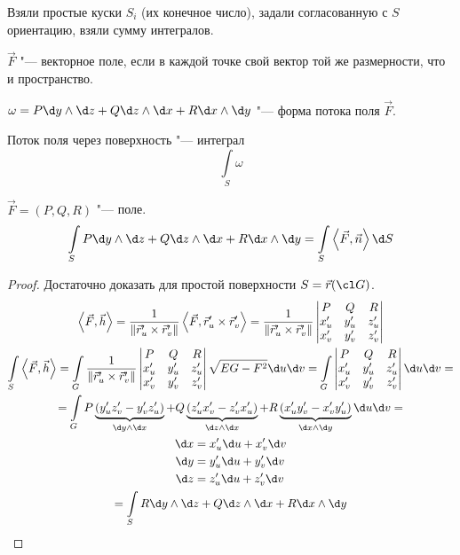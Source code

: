 \begin{Def}
	Взяли простые куски $S_i$ (их конечное число), задали согласованную с $S$ ориентацию, взяли сумму интегралов.
\end{Def}

\begin{Def}
	$\vec F$ "--- векторное поле, если в каждой точке свой вектор той же размерности, что и пространство.
\end{Def}

\begin{Def}
	$\omega = P \d y \wedge \d z + Q \d z \wedge \d x + R \d x \wedge \d y$ "--- форма потока поля $\vec F$.
\end{Def}

\begin{Def}
	Поток поля через поверхность "--- интеграл
	\[ \int\limits_S \omega \]
\end{Def}

\begin{theorem}
	$\vec F = (P, Q, R)$ "--- поле.
	\[ \int\limits_S P \d y \wedge \d z + Q \d z \wedge \d x + R \d x \wedge \d y = \int\limits_S \left<\vec F, \vec n\right> \d S \]
\end{theorem}
\begin{proof}
	Достаточно доказать для простой поверхности $S = \vec r(\cl G)$.
	\begin{gather*}
		\left<\vec F, \vec h\right>
		= \frac1{\|\vec r_u' \times \vec r_v'\|} \left<\vec F, \vec r_u' \times \vec r_v'\right>
		= \frac1{\|\vec r_u' \times \vec r_v'\|} \begin{vmatrix} P & Q & R \\ x_u' & y_u' & z_u' \\ x_v' & y_v' & z_v' \end{vmatrix} \\
		\int\limits_S \left<\vec F, \vec h\right>
		= \int\limits_G \frac1{\|\vec r_u' \times \vec r_v'\|} \begin{vmatrix} P & Q & R \\ x_u' & y_u' & z_u' \\ x_v' & y_v' & z_v' \end{vmatrix} \sqrt{EG-F^2} \d u \d v
		= \int\limits_G \begin{vmatrix} P & Q & R \\ x_u' & y_u' & z_u' \\ x_v' & y_v' & z_v' \end{vmatrix} \d u \d v = \\
		= \int\limits_G P\underbrace{(y_u' z_v' - y_v' z_u')}_{\d y \wedge \d x} + Q\underbrace{(z_u' x_v' - z_v' x_u')}_{\d z \wedge \d x} + R\underbrace{(x_u' y_v' - x_v' y_u')}_{\d x \wedge \d y} \d u \d v = \\
		\begin{aligned}
			\d x &= x_u' \d u + x_v' \d v \\
			\d y &= y_u' \d u + y_v' \d v \\
			\d z &= z_u' \d u + z_v' \d v
		\end{aligned} \\
		= \int\limits_S R \d y \wedge \d z + Q \d z \wedge \d x + R \d x \wedge \d y
	\end{gather*}
\end{proof}
